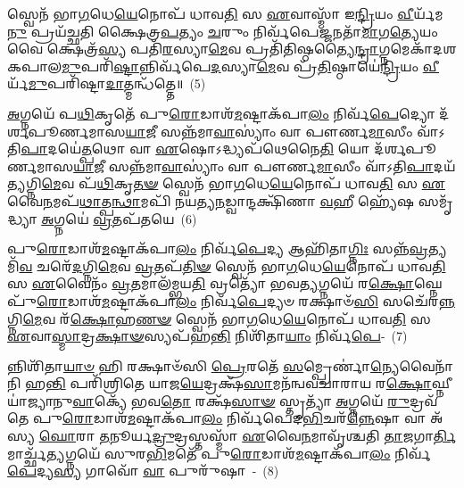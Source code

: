 𑌸𑍍𑌵𑍇𑌨᳴ 𑌭𑌾\-\ul{𑌗}\-𑌧𑍇\-\ul{𑌯𑍇}\-𑌨𑍋𑌪᳴ 𑌧𑌾𑌵\-\ul{𑌤𑌿} 𑌸 \ul{𑌏}\-𑌵𑌾𑌸𑍍𑌮𑌾᳴ 𑌇\-\ul{𑌨𑍍𑌦𑍍𑌰𑌿}\-𑌯𑌂 \ul{𑌵𑍀}\-𑌰𑍍𑌯᳴𑌮\-\ul{𑌨𑍁} 𑌪𑍍𑌰𑌯᳴𑌚𑍍𑌛𑌤𑌿 𑌕𑍍𑌷𑍈𑌤𑍍𑌰\-\ul{𑌪}\-𑌤𑍍𑌯𑌂 \ul{𑌚}\-𑌰𑍁𑌂 𑌨𑌿𑌰𑍍𑌵᳴𑌪𑍇\-\ul{𑌜𑍍𑌜}\-𑌨𑌤𑌾᳴\-\ul{𑌮𑌾}\-𑌗\-\ul{𑌤𑍍𑌯𑍇}\-𑌯𑌂 𑌵𑍈 𑌕𑍍𑌷𑍇𑌤𑍍𑌰᳴\-\ul{𑌸𑍍𑌯} 𑌪𑌤𑌿᳴\-\ul{𑌰}\-𑌸𑍍𑌯𑌾\-\ul{𑌮𑍇}\-𑌵 𑌪𑍍𑌰𑌤𑌿᳴𑌤𑌿𑌷𑍍𑌠𑌤𑍍𑌯𑍈\-\ul{𑌨𑍍𑌦𑍍𑌰𑌾}\-𑌗𑍍𑌨𑌮𑍇𑌕𑌾᳴\-𑌦𑌶\-𑌕𑌪𑌾𑌲\-\ul{𑌮𑍁}\-𑌪𑌰𑌿᳴\-\ul{𑌷𑍍𑌟𑌾}\-\-𑌨𑍍𑌨𑌿𑌰𑍍𑌵᳴𑌪𑍇\-\ul{𑌦}\-𑌸𑍍𑌯𑌾\-\ul{𑌮𑍇}\-𑌵 𑌪𑍍𑌰᳴\-\ul{𑌤𑌿}\-𑌷𑍍𑌠𑌾𑌯𑍇॑\-\ul{𑌨𑍍𑌦𑍍𑌰𑌿}\-𑌯𑌂 \ul{𑌵𑍀}\-𑌰𑍍𑌯᳴\-\ul{𑌮𑍁}\-𑌪𑌰𑌿᳴𑌷𑍍𑌟𑌾\-\ul{𑌦𑌾}\-𑌤𑍍𑌮𑌨𑍍𑌧᳴𑌤𑍍𑌤𑍇॥~(5)

{\anuvakamend[{\-\ul{𑌪𑍍𑌰}\-𑌜𑌾𑌕𑌾᳴𑌮 𑌇\-\ul{𑌨𑍍𑌦𑍍𑌰𑌾}\-𑌗𑍍𑌨𑍀 𑌉᳴𑌪\-\ul{𑌪𑍍𑌰}\-𑌯𑌾𑌤𑍍𑌯𑍈॑\-\ul{𑌨𑍍𑌦𑍍𑌰𑌾}\-𑌗𑍍𑌨𑌮𑍇𑌕𑌾᳴\-𑌦𑌶\-𑌕𑌪𑌾\-\ul{𑌲𑌂} 𑌨𑌿\-\ul{𑌰𑍍𑌵𑍀}\-𑌰𑍍𑌯𑌂᳴ \ul{𑌪𑍂}\-𑌷𑌣᳴\-\ul{𑌮𑍇}\-𑌵𑍈\-\ul{𑌕𑌾}\-𑌨𑍍𑌨𑌚᳴𑌤𑍍𑌵𑌾\-\ul{𑌰𑌿}\-\-\ul{𑍞}\-𑌶𑌚𑍍𑌚᳴}]}

\-\ul{𑌅}\-𑌗𑍍𑌨𑌯𑍇᳴ 𑌪\-\ul{𑌥𑌿}\-𑌕𑍃𑌤𑍇᳴ 𑌪𑍁\-\ul{𑌰𑍋}\-𑌡𑌾𑌶᳴\-\-\ul{𑌮}\-𑌷𑍍𑌟𑌾\-𑌕᳴𑌪𑌾\-\ul{𑌲𑌂} 𑌨𑌿𑌰𑍍𑌵᳴\-\ul{𑌪𑍇}\-𑌦𑍍𑌯𑍋 𑌦᳴𑌰𑍍\mbox{}𑌶𑌪𑍂𑌰𑍍𑌣𑌮𑌾𑌸\-\ul{𑌯𑌾}\-𑌜𑍀 𑌸𑌨𑍍𑌨᳴𑌮𑌾\-\ul{𑌵𑌾}\-𑌸𑍍𑌯𑌾𑌂॑ 𑌵𑌾 𑌪𑍗𑌰𑍍𑌣\-\ul{𑌮𑌾}\-𑌸𑍀𑌂 𑌵𑌾᳴\-𑌽𑌤𑌿\-\ul{𑌪𑌾}\-𑌦𑌯𑍇॑\-\ul{𑌤𑍍𑌪}\-𑌥𑍋 𑌵𑌾 \ul{𑌏}\-𑌷𑍋\-𑌽𑌦𑍍𑌧𑍍𑌯𑌪᳴𑌥𑍇𑌨𑍈\-\ul{𑌤𑌿} 𑌯𑍋 𑌦᳴𑌰𑍍\mbox{}𑌶𑌪𑍂𑌰𑍍𑌣𑌮𑌾𑌸\-\ul{𑌯𑌾}\-𑌜𑍀 𑌸𑌨𑍍𑌨᳴𑌮𑌾\-\ul{𑌵𑌾}\-𑌸𑍍𑌯𑌾𑌂॑ 𑌵𑌾 𑌪𑍗𑌰𑍍𑌣\-\ul{𑌮𑌾}\-𑌸𑍀𑌂 𑌵𑌾᳴\-𑌽𑌤𑌿\-\ul{𑌪𑌾}\-𑌦𑌯᳴\-\ul{𑌤𑍍𑌯}\-𑌗𑍍𑌨𑌿\-\ul{𑌮𑍇}\-𑌵 𑌪᳴\-\ul{𑌥𑌿}\-𑌕𑍃\-\ul{𑌤}\-\-\ul{𑍟} 𑌸𑍍𑌵𑍇𑌨᳴ 𑌭𑌾\-\ul{𑌗}\-𑌧𑍇\-\ul{𑌯𑍇}\-𑌨𑍋𑌪᳴ 𑌧𑌾𑌵\-\ul{𑌤𑌿} 𑌸 \ul{𑌏}\-𑌵𑍈\-\ul{𑌨}\-𑌮𑌪᳴\-\ul{𑌥𑌾}\-𑌤𑍍𑌪\-\ul{𑌨𑍍𑌥𑌾}\-𑌮𑌪𑌿᳴ 𑌨𑌯𑌤𑍍𑌯\-\ul{𑌨}\-𑌡𑍍𑌵𑌾𑌨𑍍𑌦𑌕𑍍𑌷𑌿᳴𑌣𑌾 \ul{𑌵}\-𑌹𑍀 𑌹𑍍𑌯𑍇᳴𑌷 𑌸𑌮𑍃᳴𑌦𑍍𑌧𑍍𑌯𑌾 \ul{𑌅}\-𑌗𑍍𑌨𑌯𑍇॑ \ul{𑌵𑍍𑌰}\-𑌤𑌪᳴𑌤𑌯𑍇~(6)

𑌪𑍁\-\ul{𑌰𑍋}\-𑌡𑌾𑌶᳴\-\-\ul{𑌮}\-𑌷𑍍𑌟𑌾\-𑌕᳴𑌪𑌾\-\ul{𑌲𑌂} 𑌨𑌿𑌰𑍍𑌵᳴\-\ul{𑌪𑍇}\-𑌦𑍍𑌯 𑌆𑌹𑌿᳴𑌤𑌾\-\ul{𑌗𑍍𑌨𑌿𑌃} 𑌸𑌨𑍍𑌨᳴\-\ul{𑌵𑍍𑌰}\-𑌤𑍍𑌯𑌮𑌿᳴\-\ul{𑌵} 𑌚𑌰𑍇᳴\-\ul{𑌦}\-𑌗𑍍𑌨𑌿\-\ul{𑌮𑍇}\-𑌵 \ul{𑌵𑍍𑌰}\-𑌤𑌪᳴\-\ul{𑌤𑌿}\-\-\ul{𑍟} 𑌸𑍍𑌵𑍇𑌨᳴ 𑌭𑌾\-\ul{𑌗}\-𑌧𑍇\-\ul{𑌯𑍇}\-𑌨𑍋𑌪᳴ 𑌧𑌾𑌵\-\ul{𑌤𑌿} 𑌸 \ul{𑌏}\-𑌵𑍈𑌨𑌂᳴ \ul{𑌵𑍍𑌰}\-𑌤𑌮𑌾𑌲᳴𑌮𑍍𑌭𑌯\-\ul{𑌤𑌿} 𑌵𑍍𑌰𑌤𑍍𑌯𑍋᳴ 𑌭𑌵\-\ul{𑌤𑍍𑌯}\-𑌗𑍍𑌨𑌯𑍇᳴ 𑌰\-\ul{𑌕𑍍𑌷𑍋}\-𑌘𑍍𑌨𑍇 𑌪𑍁᳴\-\ul{𑌰𑍋}\-𑌡𑌾𑌶᳴\-\ul{𑌮}\-𑌷𑍍𑌟𑌾\-𑌕᳴𑌪𑌾\-\ul{𑌲𑌂} 𑌨𑌿𑌰𑍍𑌵᳴\-\ul{𑌪𑍇}\-𑌦𑍍𑌯𑍞 𑌰𑌕𑍍𑌷𑌾𑍞᳴\-\ul{𑌸𑌿} 𑌸𑌚𑍇᳴𑌰\-\ul{𑌨𑍍𑌨}\-𑌗𑍍𑌨𑌿\-\ul{𑌮𑍇}\-𑌵 𑌰᳴\-\ul{𑌕𑍍𑌷𑍋}\-𑌹\-\ul{𑌣}\-\-\ul{𑍟} 𑌸𑍍𑌵𑍇𑌨᳴ 𑌭𑌾\-\ul{𑌗}\-𑌧𑍇\-\ul{𑌯𑍇}\-𑌨𑍋𑌪᳴ 𑌧𑌾𑌵\-\ul{𑌤𑌿} 𑌸 \ul{𑌏}\-𑌵𑌾\-\ul{𑌸𑍍𑌮𑌾}\-𑌦𑍍𑌰\-\ul{𑌕𑍍𑌷𑌾}\-\-\ul{𑍟}\-𑌸𑍍𑌯𑌪᳴\-𑌹\-\ul{𑌨𑍍𑌤𑌿} 𑌨𑌿𑌶𑌿᳴𑌤𑌾\-\ul{𑌯𑌾𑌂} 𑌨𑌿𑌰𑍍𑌵᳴\-\ul{𑌪𑍇}\--~(7)

𑌨𑍍𑌨𑌿𑌶𑌿᳴𑌤𑌾\-\ul{𑌯𑌾}\-\-\ul{𑍞} 𑌹𑌿 𑌰𑌕𑍍𑌷𑌾𑍞᳴𑌸𑌿 \ul{𑌪𑍍𑌰𑍇}\-𑌰𑌤𑍇᳴ \ul{𑌸}\-𑌮𑍍𑌪𑍍𑌰𑍇𑌰𑍍𑌣𑌾॑\-\ul{𑌨𑍍𑌯𑍇}\-𑌵𑍈𑌨𑌾᳴𑌨𑌿 𑌹\-\ul{𑌨𑍍𑌤𑌿} 𑌪𑌰𑌿᳴𑌶𑍍𑌰𑌿𑌤𑍇 𑌯𑌾𑌜\-\ul{𑌯𑍇}\-𑌦𑍍𑌰𑌕𑍍𑌷᳴\-\ul{𑌸𑌾}\-𑌮𑌨᳴𑌨𑍍𑌵𑌵𑌚𑌾𑌰𑌾𑌯 𑌰\-\ul{𑌕𑍍𑌷𑍋}\-𑌘𑍍𑌨𑍀 𑌯𑌾॑𑌜𑍍𑌯𑌾𑌨𑍁\-\ul{𑌵𑌾}\-𑌕𑍍𑌯𑍇᳴ 𑌭𑌵\-\ul{𑌤𑍋} 𑌰𑌕𑍍𑌷᳴\-\ul{𑌸𑌾}\-\-\ul{𑍟} 𑌸𑍍𑌤𑍃𑌤𑍍𑌯𑌾᳴ \ul{𑌅}\-𑌗𑍍𑌨𑌯𑍇᳴ \ul{𑌰𑍁}\-𑌦𑍍𑌰𑌵᳴𑌤𑍇 𑌪𑍁\-\ul{𑌰𑍋}\-𑌡𑌾𑌶᳴\-\-\ul{𑌮}\-𑌷𑍍𑌟𑌾\-𑌕᳴𑌪𑌾\-\ul{𑌲𑌂} 𑌨𑌿𑌰𑍍𑌵᳴𑌪𑍇𑌦\-\ul{𑌭𑌿}\-𑌚𑌰᳴\-\ul{𑌨𑍍𑌨𑍇}\-𑌷𑌾 𑌵𑌾 𑌅᳴𑌸𑍍𑌯 \ul{𑌘𑍋}\-𑌰𑌾 \ul{𑌤}\-𑌨𑍂𑌰𑍍𑌯\-\ul{𑌦𑍍𑌰𑍁}\-𑌦𑍍𑌰𑌸𑍍𑌤𑌸𑍍𑌮𑌾᳴ \ul{𑌏}\-𑌵𑍈\-\ul{𑌨}\-𑌮𑌾𑌵𑍃᳴𑌶𑍍𑌚𑌤𑌿 \ul{𑌤𑌾}\-𑌜𑌗𑌾\-\ul{𑌰𑍍𑌤𑌿}\-𑌮𑌾𑌰𑍍𑌚𑍍𑌛᳴\-\ul{𑌤𑍍𑌯}\-𑌗𑍍𑌨𑌯𑍇᳴ 𑌸𑍁𑌰\-\ul{𑌭𑌿}\-𑌮𑌤𑍇᳴ 𑌪𑍁\-\ul{𑌰𑍋}\-𑌡𑌾𑌶᳴\-\-\ul{𑌮}\-𑌷𑍍𑌟𑌾\-𑌕᳴𑌪𑌾\-\ul{𑌲𑌂} 𑌨𑌿𑌰𑍍𑌵᳴\-\ul{𑌪𑍇}\-𑌦𑍍𑌯\-\ul{𑌸𑍍𑌯} 𑌗𑌾𑌵𑍋᳴ \ul{𑌵𑌾} 𑌪𑍁𑌰𑍁᳴𑌷𑌾~-~(8)

